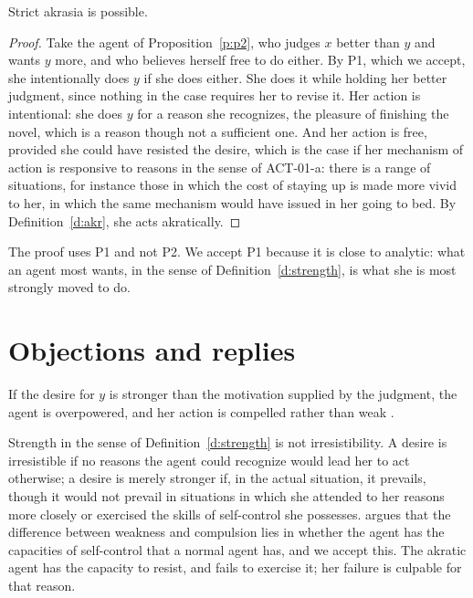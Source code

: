 \documentclass{situationist-preprint}
\begin{document}
\begin{theorem}\label{t:main}
Strict akrasia is possible.
\end{theorem}

\begin{proof}
Take the agent of Proposition~\ref{p:p2}, who judges $x$ better than $y$ and wants $y$ more, and who believes herself free to do either. By P1, which we accept, she intentionally does $y$ if she does either. She does it while holding her better judgment, since nothing in the case requires her to revise it. Her action is intentional: she does $y$ for a reason she recognizes, the pleasure of finishing the novel, which is a reason though not a sufficient one. And her action is free, provided she could have resisted the desire, which is the case if her mechanism of action is responsive to reasons in the sense of ACT-01-a: there is a range of situations, for instance those in which the cost of staying up is made more vivid to her, in which the same mechanism would have issued in her going to bed. By Definition~\ref{d:akr}, she acts akratically.
\end{proof}

The proof uses P1 and not P2. We accept P1 because it is close to analytic: what an agent most wants, in the sense of Definition~\ref{d:strength}, is what she is most strongly moved to do.

\section{Objections and replies}

\begin{objection}[Compulsion]
If the desire for $y$ is stronger than the motivation supplied by the judgment, the agent is overpowered, and her action is compelled rather than weak \citep{Watson1977}.
\end{objection}

\begin{reply}
Strength in the sense of Definition~\ref{d:strength} is not irresistibility. A desire is irresistible if no reasons the agent could recognize would lead her to act otherwise; a desire is merely stronger if, in the actual situation, it prevails, though it would not prevail in situations in which she attended to her reasons more closely or exercised the skills of self-control she possesses. \citet{Watson1977} argues that the difference between weakness and compulsion lies in whether the agent has the capacities of self-control that a normal agent has, and we accept this. The akratic agent has the capacity to resist, and fails to exercise it; her failure is culpable for that reason.
\end{reply}
\end{document}
